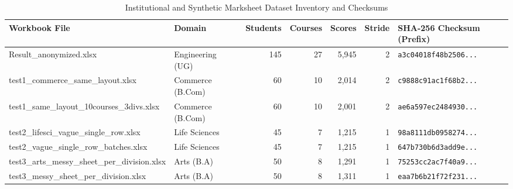 \begin{table}[t]
\centering
\small
\caption{Institutional and Synthetic Marksheet Dataset Inventory and Checksums}
\label{tab:datasets}
\begin{tabular}{llrrrrl}
\toprule
\textbf{Workbook File} & \textbf{Domain} & \textbf{Students} & \textbf{Courses} & \textbf{Scores} & \textbf{Stride} & \textbf{SHA-256 Checksum (Prefix)} \\
\midrule
Result\_anonymized.xlsx & Engineering (UG) & 145 & 27 & 5,945 & 2 & \texttt{a3c04018f48b2506...} \\
test1\_commerce\_same\_layout.xlsx & Commerce (B.Com) & 60 & 10 & 2,014 & 2 & \texttt{c9888c91ac1f68b2...} \\
test1\_same\_layout\_10courses\_3divs.xlsx & Commerce (B.Com) & 60 & 10 & 2,001 & 2 & \texttt{ae6a597ec2484930...} \\
test2\_lifesci\_vague\_single\_row.xlsx & Life Sciences & 45 & 7 & 1,215 & 1 & \texttt{98a8111db0958274...} \\
test2\_vague\_single\_row\_batches.xlsx & Life Sciences & 45 & 7 & 1,215 & 1 & \texttt{647b730b6d3add9e...} \\
test3\_arts\_messy\_sheet\_per\_division.xlsx & Arts (B.A) & 50 & 8 & 1,291 & 1 & \texttt{75253cc2ac7f40a9...} \\
test3\_messy\_sheet\_per\_division.xlsx & Arts (B.A) & 50 & 8 & 1,311 & 1 & \texttt{eaa7b6b21f72f231...} \\
\bottomrule
\end{tabular}
\end{table}
